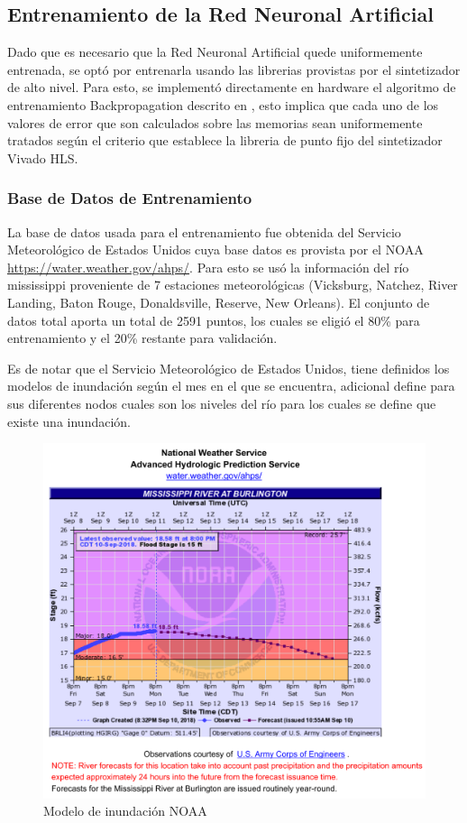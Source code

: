 \subsection{Entrenamiento de la Red Neuronal Artificial}

Dado que es necesario que la Red Neuronal Artificial quede uniformemente entrenada, se optó por entrenarla usando las librerias provistas por el sintetizador de alto nivel. Para esto, se implementó directamente en hardware el algoritmo de entrenamiento Backpropagation descrito en \citep{backprop}, esto implica que cada uno de los valores de error que son calculados sobre las memorias sean uniformemente tratados según el criterio que establece la libreria de punto fijo del sintetizador Vivado HLS.


\subsubsection{Base de Datos de Entrenamiento}

La base de datos usada para el entrenamiento fue obtenida del Servicio Meteorológico de Estados Unidos cuya base datos es provista por el NOAA \href{https://water.weather.gov/ahps/}{https://water.weather.gov/ahps/}. Para esto se usó la información del río mississippi proveniente de 7 estaciones meteorológicas (Vicksburg, Natchez, River Landing, Baton Rouge, Donaldsville, Reserve, New Orleans). El conjunto de datos total aporta un total de 2591 puntos, los cuales se eligió el 80\% para entrenamiento y el 20\% restante para validación.

Es de notar que el Servicio Meteorológico de Estados Unidos, tiene definidos los modelos de inundación según el mes en el que se encuentra, adicional define para sus diferentes nodos cuales son los niveles del río para los cuales se define que existe una inundación.

\begin{figure}[H]
	\centering
		\includegraphics[scale=0.7]{./Figures/weather}
	\caption{Modelo de inundación NOAA}
	\label{fig:weatherMississippi}
\end{figure}

